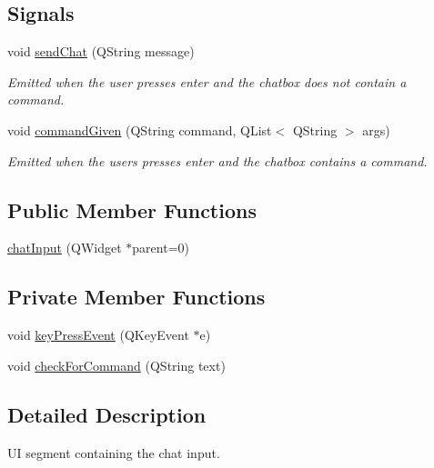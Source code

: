 \subsection*{Signals}
\begin{DoxyCompactItemize}
\item 
void \hyperlink{classclient_1_1chat_input_abfb6a31b8691c93a03c3bda792e14f34}{send\-Chat} (Q\-String message)
\begin{DoxyCompactList}\small\item\em Emitted when the user presses enter and the chatbox does not contain a command. \end{DoxyCompactList}\item 
void \hyperlink{classclient_1_1chat_input_a955c343e83632ba1cc0a0b089c06803e}{command\-Given} (Q\-String command, Q\-List$<$ Q\-String $>$ args)
\begin{DoxyCompactList}\small\item\em Emitted when the users presses enter and the chatbox contains a command. \end{DoxyCompactList}\end{DoxyCompactItemize}
\subsection*{Public Member Functions}
\begin{DoxyCompactItemize}
\item 
\hyperlink{classclient_1_1chat_input_aedaf9d2d9c72302f3b3e679ce7758806}{chat\-Input} (Q\-Widget $\ast$parent=0)
\end{DoxyCompactItemize}
\subsection*{Private Member Functions}
\begin{DoxyCompactItemize}
\item 
void \hyperlink{classclient_1_1chat_input_a18489fc74edbd3948434ec0be0e3fe7e}{key\-Press\-Event} (Q\-Key\-Event $\ast$e)
\item 
void \hyperlink{classclient_1_1chat_input_a16941b1cc04b2333d3d5328e23b4afdf}{check\-For\-Command} (Q\-String text)
\end{DoxyCompactItemize}


\subsection{Detailed Description}
U\-I segment containing the chat input. 

